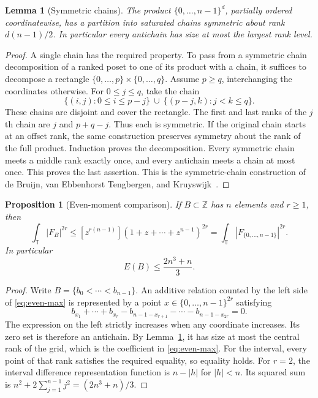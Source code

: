 \documentclass[11pt,reqno]{amsart}
\numberwithin{equation}{section}
\newtheorem{lemma}[theorem]{Lemma}
\newtheorem{proposition}[theorem]{Proposition}
\theoremstyle{definition}
\theoremstyle{remark}
\newcommand{\Z}{\mathbb Z}
\newcommand{\T}{\mathbb T}
\begin{document}
\begin{lemma}[Symmetric chains]\label{lem:chains}
The product $\{0,\ldots,n-1\}^d$, partially ordered coordinatewise, has a
partition into saturated chains symmetric about rank $d(n-1)/2$.
In particular every antichain has size at most the largest rank level.
\end{lemma}
\begin{proof}
A single chain has the required property. To pass from a symmetric chain
decomposition of a ranked poset to one of its product with a chain, it
suffices to decompose a rectangle $\{0,\ldots,p\}\times\{0,\ldots,q\}$.
Assume $p\ge q$, interchanging the coordinates otherwise. For
$0\le j\le q$, take the chain
\[
 \{(i,j):0\le i\le p-j\}
 \ \cup\ \{(p-j,k):j<k\le q\}.
\]
These chains are disjoint and cover the rectangle. The first and last
ranks of the $j$th chain are $j$ and $p+q-j$. Thus each is symmetric.
If the original chain starts at an offset rank, the same construction
preserves symmetry about the rank of the full product. Induction proves
the decomposition. Every symmetric chain meets a middle rank exactly
once, and every antichain meets a chain at most once. This proves the
last assertion. This is the symmetric-chain construction of de Bruijn,
van Ebbenhorst Tengbergen, and Kruyswijk~\cite{BTK}.
\end{proof}

\begin{proposition}[Even-moment comparison]\label{prop:moments}
If $B\subset\Z$ has $n$ elements and $r\ge1$, then
\begin{equation}\label{eq:even-max}
 \int_\T|F_B|^{2r}\le
 [z^{r(n-1)}](1+z+\cdots+z^{n-1})^{2r}
 =\int_\T|F_{\{0,\ldots,n-1\}}|^{2r}.
\end{equation}
In particular
\begin{equation}\label{eq:energy-max}
 E(B)\le\frac{2n^3+n}{3}.
\end{equation}
\end{proposition}
\begin{proof}
Write $B=\{b_0<\cdots<b_{n-1}\}$. An additive relation counted by the
left side of \eqref{eq:even-max} is represented by a point
$x\in\{0,\ldots,n-1\}^{2r}$ satisfying
\[
 b_{x_1}+\cdots+b_{x_r}
 -b_{n-1-x_{r+1}}-\cdots-b_{n-1-x_{2r}}=0.
\]
The expression on the left strictly increases when any coordinate
increases. Its zero set is therefore an antichain. By
Lemma~\ref{lem:chains}, it has size at most the central rank of the grid,
which is the coefficient in \eqref{eq:even-max}. For the interval, every
point of that rank satisfies the required equality, so equality holds.
For $r=2$, the interval difference representation function is
$n-|h|$ for $|h|<n$. Its squared sum is
$n^2+2\sum_{j=1}^{n-1}j^2=(2n^3+n)/3$.
\end{proof}
\end{document}
